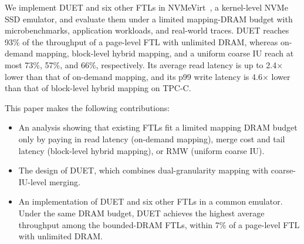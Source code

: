 We implement DUET and six other FTLs in NVMeVirt~\cite{nvmevirt}, a kernel-level
NVMe SSD emulator, and evaluate them under a limited mapping-DRAM budget with
microbenchmarks, application workloads, and real-world traces. DUET reaches 93\%
of the throughput of a page-level FTL with unlimited DRAM,
whereas on-demand mapping, block-level hybrid mapping, and a uniform coarse IU reach at most
73\%, 57\%, and 66\%, respectively. Its average read latency is up to
2.4$\times$ lower than that of on-demand mapping, and its p99 write latency is
4.6$\times$ lower than that of block-level hybrid mapping on TPC-C.

This paper makes the following contributions:
\begin{itemize}
  \item An analysis showing that existing FTLs fit a limited mapping DRAM budget only by
  paying in read latency (on-demand mapping), merge cost and tail latency
  (block-level hybrid mapping), or RMW (uniform coarse IU).
  \item The design of DUET, which combines dual-granularity mapping with coarse-IU-level
  merging.
  \item An implementation of DUET and six other FTLs in a common emulator. Under the
  same DRAM budget, DUET achieves the highest average throughput among the
  bounded-DRAM FTLs, within 7\% of a page-level FTL with unlimited DRAM.
\end{itemize}
